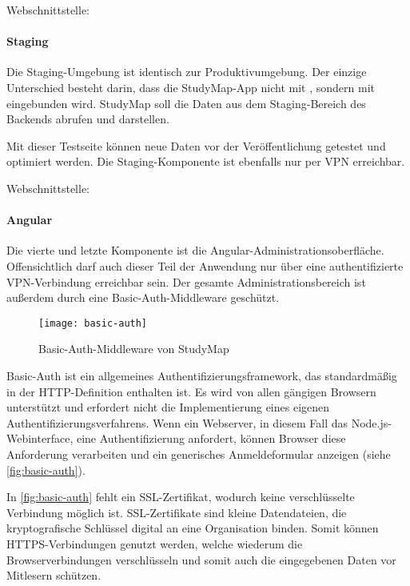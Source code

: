 \noindent
Webschnittstelle: 

\paragraph*{Staging}
Die Staging-Umgebung ist identisch zur Produktivumgebung. Der einzige Unterschied besteht darin, dass die StudyMap-App nicht mit , sondern mit  eingebunden wird. StudyMap soll die Daten aus dem Staging-Bereich des Backends abrufen und darstellen.

Mit dieser Testseite können neue Daten vor der Veröffentlichung getestet und optimiert werden. Die Staging-Komponente ist ebenfalls nur per VPN erreichbar.

\noindent
Webschnittstelle: 

\paragraph*{Angular}\label{paragraph:angular-basic-auth}
Die vierte und letzte Komponente ist die Angular-Administrationsoberfläche. Offensichtlich darf auch dieser Teil der Anwendung nur über eine authentifizierte VPN-Verbindung erreichbar sein. Der gesamte Administrationsbereich ist außerdem durch eine Basic-Auth-Middleware geschützt.

\begin{figure}[H]
    \centering
    \texttt{[image: basic-auth]}
    \caption{Basic-Auth-Middleware von StudyMap}
    \label{fig:basic-auth}
\end{figure}

Basic-Auth ist ein allgemeines Authentifizierungsframework, das standardmäßig in der HTTP-Definition enthalten ist. \parencite{mozilla_corporation_http_2023} Es wird von allen gängigen Browsern unterstützt und erfordert nicht die Implementierung eines eigenen Authentifizierungsverfahrens. \parencite{fyrd_headers_2024} Wenn ein Webserver, in diesem Fall das Node.js-Webinterface, eine Authentifizierung anfordert, können Browser diese Anforderung verarbeiten und ein generisches Anmeldeformular anzeigen (siehe \autoref{fig:basic-auth}).

In \autoref{fig:basic-auth} fehlt ein SSL-Zertifikat, wodurch keine verschlüsselte Verbindung möglich ist. SSL-Zertifikate sind kleine Datendateien, die kryptografische Schlüssel digital an eine Organisation binden. Somit können HTTPS-Verbindungen genutzt werden, welche wiederum die Browserverbindungen verschlüsseln und somit auch die eingegebenen Daten vor Mitlesern schützen. \parencite{globalsign_was_2023}


